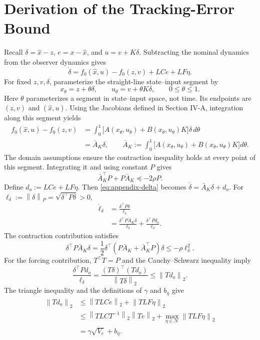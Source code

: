 \documentclass[11pt,a4paper]{article}
\numberwithin{equation}{section}
\theoremstyle{remark}\newtheorem{remark}{Remark}
\newcommand{\norm}[1]{\left\lVert#1\right\rVert}
\begin{document}
\section{Derivation of the Tracking-Error Bound}\label{app:tracking-bound}
Recall $\delta=\hat x-z$, $e=x-\hat x$, and $u=v+K\delta$. Subtracting the nominal dynamics from the observer dynamics gives
\begin{equation}\label{eq:appendix-delta}
\dot\delta=f_0(\hat x,u)-f_0(z,v)+LCe+LF\eta.
\end{equation}
For fixed $z,v,\delta$, parameterize the straight-line state--input segment by
\[
x_\theta=z+\theta\delta,\qquad
u_\theta=v+\theta K\delta,\qquad 0\le\theta\le1.
\]
Here $\theta$ parameterizes a segment in state--input space, not time. Its endpoints are $(z,v)$ and $(\hat x,u)$. Using the Jacobians defined in Section IV-A, integration along this segment yields
\begin{align}
f_0(\hat x,u)-f_0(z,v)
&=\int_0^1\bigl[A(x_\theta,u_\theta)+B(x_\theta,u_\theta)K\bigr]\delta\,d\theta\\
&=\bar A_K\delta,\qquad
\bar A_K:=\int_0^1\bigl[A(x_\theta,u_\theta)+B(x_\theta,u_\theta)K\bigr]d\theta.
\end{align}
The domain assumptions ensure the contraction inequality holds at every point of this segment. Integrating it and using constant $P$ gives
\begin{equation}
\bar A_K^\top P+P\bar A_K\preceq-2\rho P.
\end{equation}
Define $d_o:=LCe+LF\eta$. Then \eqref{eq:appendix-delta} becomes $\dot\delta=\bar A_K\delta+d_o$. For $\ell_\delta:=\norm\delta_P=\sqrt{\delta^\top P\delta}>0$,
\begin{align}
\dot\ell_\delta
&=\frac{\delta^\top P\dot\delta}{\ell_\delta}\\
&=\frac{\delta^\top P\bar A_K\delta}{\ell_\delta}
+\frac{\delta^\top Pd_o}{\ell_\delta}.
\end{align}
The contraction contribution satisfies
\[
\delta^\top P\bar A_K\delta
=\frac12\delta^\top(P\bar A_K+\bar A_K^\top P)\delta
\le-\rho\ell_\delta^2.
\]
For the forcing contribution, $T^\top T=P$ and the Cauchy--Schwarz inequality imply
\[
\frac{\delta^\top Pd_o}{\ell_\delta}
=\frac{(T\delta)^\top(Td_o)}{\norm{T\delta}_2}
\le\norm{Td_o}_2.
\]
The triangle inequality and the definitions of $\gamma$ and $b_\eta$ give
\begin{align}
\norm{Td_o}_2
&\le\norm{TLCe}_2+\norm{TLF\eta}_2\\
&\le\norm{TLC T^{-1}}_2\norm{Te}_2
+\max_{\eta\in\mathcal N}\norm{TLF\eta}_2\\
&=\gamma\sqrt{V_e}+b_\eta.
\end{align}
\end{document}
